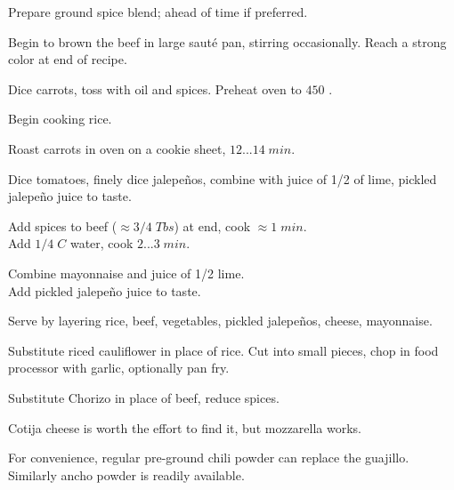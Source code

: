 
\begin{preparation}
\item Prepare ground spice blend; ahead of time if preferred.

\item Begin to brown the beef in large saut\'{e} pan, stirring occasionally. Reach a strong color at end of recipe.

\item Dice carrots, toss with oil and spices. Preheat oven to $450$ \Fahrenheit.

\item Begin cooking rice.

\item Roast carrots in oven on a cookie sheet, $12...14\;min$.

\item Dice tomatoes, finely dice jalepe\~{n}os, combine with juice of 1/2 of lime, pickled jalepe\~{n}o juice to taste.

\item Add spices to beef ($\approx 3/4\; Tbs$) at end, cook $\approx1\; min$.\\Add $1/4\;C$ water, cook $2...3\;min$.

\item Combine mayonnaise and juice of 1/2 lime.\\Add pickled jalepe\~{n}o juice to taste.

\item Serve by layering rice, beef, vegetables, pickled jalepe\~{n}os, cheese, mayonnaise.
\end{preparation}

\begin{variation}
\item Substitute riced cauliflower in place of rice. Cut into small pieces, chop in food processor with garlic, optionally pan fry.
\item Substitute Chorizo in place of beef, reduce spices.
\item Cotija cheese is worth the effort to find it, but mozzarella works.
\item For convenience, regular pre-ground chili powder can replace the guajillo. Similarly ancho powder is readily available.
\end{variation}

\recipeend
